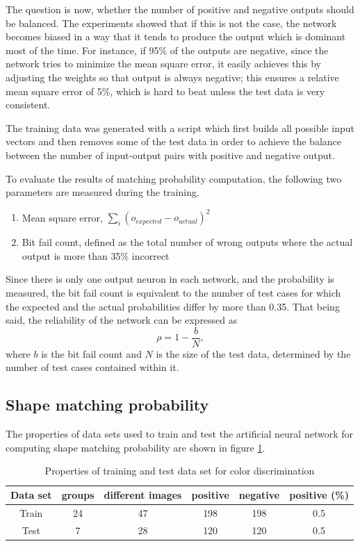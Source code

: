 \documentclass[times, utf8, zavrsni]{fer}
\begin{document}
The question is now, whether the number of positive and negative outputs should
be balanced. The experiments showed that if this is not the case, the network
becomes biased in a way that it tends to produce the output which is dominant
most of the time. For instance, if 95\% of the outputs are negative, since the
network tries to minimize the mean square error, it easily achieves this by
adjusting the weights so that output is always negative; this ensures a relative
mean square error of 5\%, which is hard to beat unless the test data is very
consistent.

The training data was generated with a script which first builds all
possible input vectors and then removes some of the test data in order to
achieve the balance between the number of input-output pairs with positive and
negative output.

To evaluate the results of matching probability computation, the following two
parameters are measured during the training.

\begin{enumerate}
  \item Mean square error, $\sum_{i}{(o_{expected} - o_{actual})^2}$
  \item Bit fail count, defined as the total number of wrong outputs where the
  actual output is more than 35\% incorrect %
\end{enumerate}

Since there is only one output neuron in each network, and the probability is
measured, the bit fail count is equivalent to the number of test cases for which
the expected and the actual probabilities differ by more than 0.35. That being
said, the reliability of the network can be expressed as \[ \rho = 1
- \frac{b}{N}, \] where $b$ is the bit fail count and $N$ is the size of the
test data, determined by the number of test cases contained within it.

\subsection{Shape matching probability}

The properties of data sets used to train and test the artificial neural network
for computing shape matching probability are shown in figure 
\ref{table:shape-data-properties}.

\begin{table}[h]
\begin{center} {\footnotesize
\begin{tabular}{c|c|c|c|c|c}
Data set & groups & different images & positive & negative & positive (\%) \\
\hline
Train & 24 & 47 & 198 & 198 & 0.5 \\
Test & 7 & 28 & 120 & 120 & 0.5 \\
\end{tabular} }
\end{center}
\caption{\footnotesize Properties of training and test data set for color
discrimination}
\label{table:shape-data-properties}
\end{table}
\end{document}
